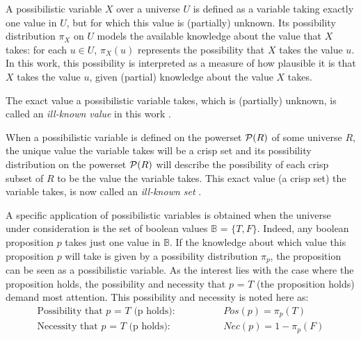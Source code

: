 \begin{definition}
A possibilistic variable $X$ over a universe $U$ is defined as a variable taking exactly one value in $U$, but for which this value is (partially) unknown. Its possibility distribution $\pi_X$ on $U$ models the available knowledge about the value that $X$ takes: for each $u\in U$, $\pi_X(u)$ represents the possibility that $X$ takes the value $u$. In this work, this possibility is interpreted as a measure of how plausible it is that $X$ takes the value $u$, given (partial) knowledge about the value $X$ takes.
\end{definition}

The exact value a possibilistic variable takes, which is (partially) unknown, is called an \emph{ill-known value} in this work \cite{Dubois88b}.

When a possibilistic variable is defined on the powerset $\mathcal{P}(R)$ of some universe $R$, the unique value the variable takes will be a crisp set and its possibility distribution on the powerset $\mathcal{P}(R)$ will describe the possibility of each crisp subset of $R$ to be the value the variable takes. This exact value (a crisp set) the variable takes, is now called an \emph{ill-known set} \cite{Dubois88b}.



A specific application of possibilistic variables is obtained when the universe under consideration is the set of boolean values $\mathbb{B}$ = $\{T,F\}$. Indeed, any boolean proposition $p$ takes just one value in $\mathbb{B}$. If the knowledge about which value this proposition $p$ will take is given by a possibility distribution $\pi_p$, the proposition can be seen as a possibilistic variable. As the interest lies with the case where the proposition holds, the possibility and necessity that $p$ = $T$ (the proposition holds) demand most attention. This possibility and necessity is noted here as:
\begin{align}
\text{Possibility that $p$ = $T$ (p holds):} \hspace{50pt} & Pos(p) = \pi_p(T) \label{propholdsposs} \\
\text{Necessity that $p$ = $T$ (p holds):} \hspace{50pt} & Nec(p) = 1-\pi_p(F) \label{propholdsnecc}
\end{align}

